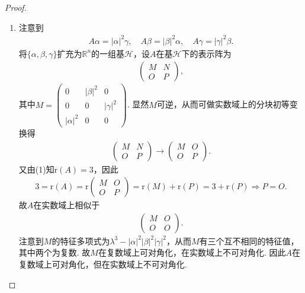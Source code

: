 \documentclass[../../main.tex]{subfiles}
\begin{document}
\begin{proof}
\begin{enumerate}[(1)]
\item 注意到
\begin{align*}
A\alpha=|\alpha|^2\gamma,\quad A\beta=|\beta|^2\alpha,\quad A\gamma=|\gamma|^2\beta.
\end{align*}
将$\{\alpha,\beta,\gamma\}$扩充为$\mathbb{R}^n$的一组基$\mathscr{H}$，设$A$在基$\mathscr{H}$下的表示阵为
\begin{align*}
\begin{pmatrix}
M&N\\
O& P
\end{pmatrix},
\end{align*}
其中$M=\begin{pmatrix}
0&|\beta|^2&0\\
0&0&|\gamma|^2\\
|\alpha|^2&0&0
\end{pmatrix}$.
显然$M$可逆，从而可做实数域上的分块初等变换得
\begin{align*}
\begin{pmatrix}
M&N\\
O& P
\end{pmatrix}\rightarrow \begin{pmatrix}
M&O\\
O& P
\end{pmatrix}.
\end{align*}
又由(1)知$\text{r}(A)=3$，因此
\begin{align*}
3=\text{r}(A)=\text{r}\begin{pmatrix}
M&O\\
O& P
\end{pmatrix}=\text{r}(M)+\text{r}(P)=3+\text{r}(P)\Longrightarrow P=O.
\end{align*}
故$A$在实数域上相似于
\begin{align*}
\begin{pmatrix}
M&O\\
O&O
\end{pmatrix}.
\end{align*}
注意到$M$的特征多项式为$\lambda^3-|\alpha|^2|\beta|^2|\gamma|^2$，从而$M$有三个互不相同的特征值，其中两个为复数. 故$M$在复数域上可对角化，在实数域上不可对角化. 因此$A$在复数域上可对角化，但在实数域上不可对角化.
\end{enumerate}

\end{proof}
\end{document}
